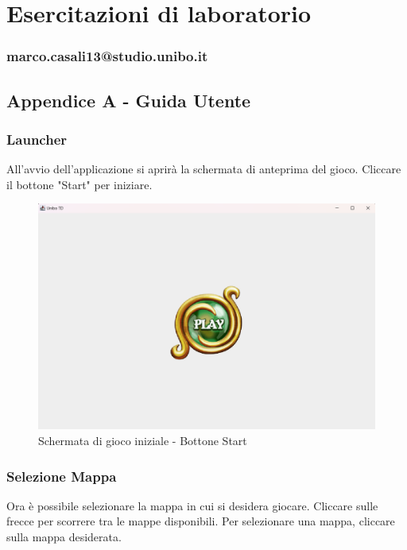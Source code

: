 \documentclass[a4paper,12pt]{report}
\begin{document}
\chapter{Esercitazioni di laboratorio}
\subsection{marco.casali13@studio.unibo.it}


\newpage
\section{Appendice A - Guida Utente}

\subsection{Launcher}
All'avvio dell'applicazione si aprirà la schermata di anteprima del gioco. Cliccare il bottone "Start" per iniziare.

\begin{figure}[H]
    \centering
    \includegraphics[scale=0.5]{Start}
    \caption{Schermata di gioco iniziale - Bottone Start}
    \label{fig:start}
\end{figure}

\subsection{Selezione Mappa}
Ora è possibile selezionare la mappa in cui si desidera giocare. Cliccare sulle frecce per scorrere tra le mappe disponibili. Per selezionare una mappa, cliccare sulla mappa desiderata.
\end{document}
